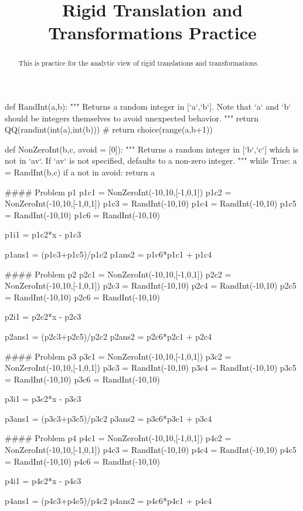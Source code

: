 \documentclass{ximera}
\title{Rigid Translation and Transformations Practice}
\begin{document}
\begin{abstract}
    This is practice for the analytic view of rigid translations and transformations.
\end{abstract}
\maketitle

\begin{sagesilent}
def RandInt(a,b):
    """ Returns a random integer in [`a`,`b`]. Note that `a` and `b` should be integers themselves to avoid unexpected behavior.
    """
    return QQ(randint(int(a),int(b)))
    # return choice(range(a,b+1))

def NonZeroInt(b,c, avoid = [0]):
    """ Returns a random integer in [`b`,`c`] which is not in `av`. 
        If `av` is not specified, defaults to a non-zero integer.
    """
    while True:
        a = RandInt(b,c)
        if a not in avoid:
            return a


#### Problem p1
p1c1 = NonZeroInt(-10,10,[-1,0,1])
p1c2 = NonZeroInt(-10,10,[-1,0,1])
p1c3 = RandInt(-10,10)
p1c4 = RandInt(-10,10)
p1c5 = RandInt(-10,10)
p1c6 = RandInt(-10,10)

p1i1 = p1c2*x - p1c3

p1ans1 = (p1c3+p1c5)/p1c2
p1ans2 = p1c6*p1c1 + p1c4


#### Problem p2
p2c1 = NonZeroInt(-10,10,[-1,0,1])
p2c2 = NonZeroInt(-10,10,[-1,0,1])
p2c3 = RandInt(-10,10)
p2c4 = RandInt(-10,10)
p2c5 = RandInt(-10,10)
p2c6 = RandInt(-10,10)

p2i1 = p2c2*x - p2c3

p2ans1 = (p2c3+p2c5)/p2c2
p2ans2 = p2c6*p2c1 + p2c4


#### Problem p3
p3c1 = NonZeroInt(-10,10,[-1,0,1])
p3c2 = NonZeroInt(-10,10,[-1,0,1])
p3c3 = RandInt(-10,10)
p3c4 = RandInt(-10,10)
p3c5 = RandInt(-10,10)
p3c6 = RandInt(-10,10)

p3i1 = p3c2*x - p3c3

p3ans1 = (p3c3+p3c5)/p3c2
p3ans2 = p3c6*p3c1 + p3c4


#### Problem p4
p4c1 = NonZeroInt(-10,10,[-1,0,1])
p4c2 = NonZeroInt(-10,10,[-1,0,1])
p4c3 = RandInt(-10,10)
p4c4 = RandInt(-10,10)
p4c5 = RandInt(-10,10)
p4c6 = RandInt(-10,10)

p4i1 = p4c2*x - p4c3

p4ans1 = (p4c3+p4c5)/p4c2
p4ans2 = p4c6*p4c1 + p4c4



\end{sagesilent}
\end{document}
